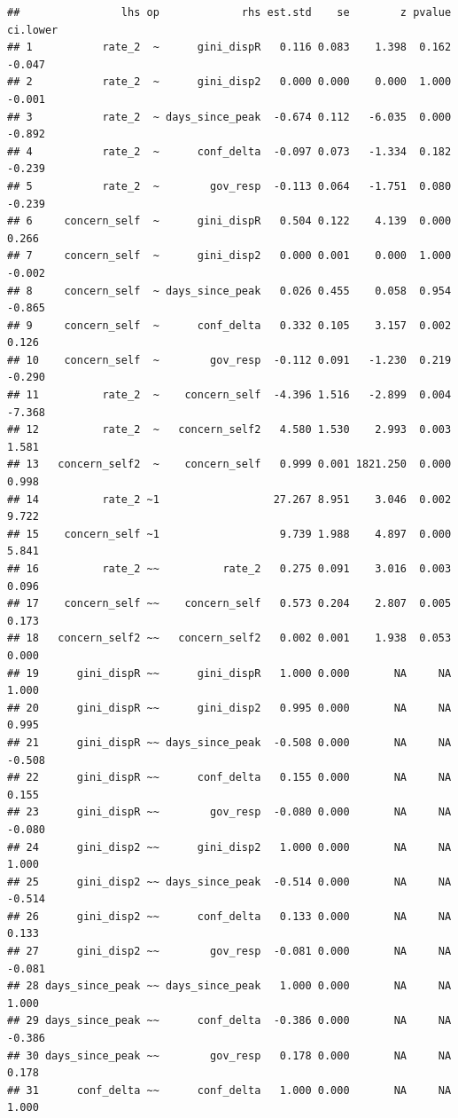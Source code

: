 \documentclass[
]{article}
\begin{document}
\begin{verbatim}
##                lhs op             rhs est.std    se        z pvalue ci.lower
## 1           rate_2  ~      gini_dispR   0.116 0.083    1.398  0.162   -0.047
## 2           rate_2  ~      gini_disp2   0.000 0.000    0.000  1.000   -0.001
## 3           rate_2  ~ days_since_peak  -0.674 0.112   -6.035  0.000   -0.892
## 4           rate_2  ~      conf_delta  -0.097 0.073   -1.334  0.182   -0.239
## 5           rate_2  ~        gov_resp  -0.113 0.064   -1.751  0.080   -0.239
## 6     concern_self  ~      gini_dispR   0.504 0.122    4.139  0.000    0.266
## 7     concern_self  ~      gini_disp2   0.000 0.001    0.000  1.000   -0.002
## 8     concern_self  ~ days_since_peak   0.026 0.455    0.058  0.954   -0.865
## 9     concern_self  ~      conf_delta   0.332 0.105    3.157  0.002    0.126
## 10    concern_self  ~        gov_resp  -0.112 0.091   -1.230  0.219   -0.290
## 11          rate_2  ~    concern_self  -4.396 1.516   -2.899  0.004   -7.368
## 12          rate_2  ~   concern_self2   4.580 1.530    2.993  0.003    1.581
## 13   concern_self2  ~    concern_self   0.999 0.001 1821.250  0.000    0.998
## 14          rate_2 ~1                  27.267 8.951    3.046  0.002    9.722
## 15    concern_self ~1                   9.739 1.988    4.897  0.000    5.841
## 16          rate_2 ~~          rate_2   0.275 0.091    3.016  0.003    0.096
## 17    concern_self ~~    concern_self   0.573 0.204    2.807  0.005    0.173
## 18   concern_self2 ~~   concern_self2   0.002 0.001    1.938  0.053    0.000
## 19      gini_dispR ~~      gini_dispR   1.000 0.000       NA     NA    1.000
## 20      gini_dispR ~~      gini_disp2   0.995 0.000       NA     NA    0.995
## 21      gini_dispR ~~ days_since_peak  -0.508 0.000       NA     NA   -0.508
## 22      gini_dispR ~~      conf_delta   0.155 0.000       NA     NA    0.155
## 23      gini_dispR ~~        gov_resp  -0.080 0.000       NA     NA   -0.080
## 24      gini_disp2 ~~      gini_disp2   1.000 0.000       NA     NA    1.000
## 25      gini_disp2 ~~ days_since_peak  -0.514 0.000       NA     NA   -0.514
## 26      gini_disp2 ~~      conf_delta   0.133 0.000       NA     NA    0.133
## 27      gini_disp2 ~~        gov_resp  -0.081 0.000       NA     NA   -0.081
## 28 days_since_peak ~~ days_since_peak   1.000 0.000       NA     NA    1.000
## 29 days_since_peak ~~      conf_delta  -0.386 0.000       NA     NA   -0.386
## 30 days_since_peak ~~        gov_resp   0.178 0.000       NA     NA    0.178
## 31      conf_delta ~~      conf_delta   1.000 0.000       NA     NA    1.000

\end{verbatim}
\end{document}
